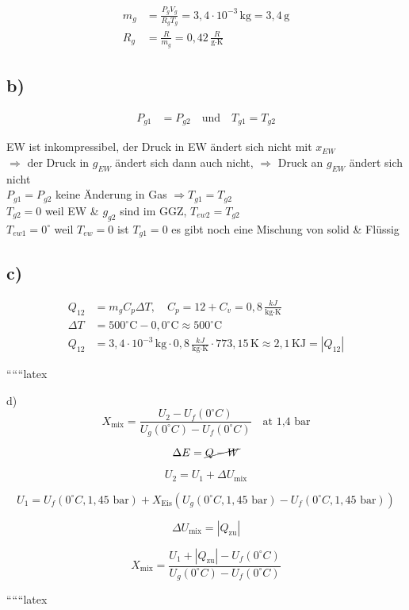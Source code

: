 \begin{align*}
m_g &= \frac{P_g V_g}{R_g T_g} = 3,4 \cdot 10^{-3} \, \text{kg} = 3,4 \, \text{g} \\
R_g &= \frac{R}{m_g} = 0,42 \, \frac{R}{\text{g} \cdot \text{K}}
\end{align*}

\subsection*{b)}
\begin{align*}
P_{g1} &= P_{g2} \quad \text{und} \quad T_{g1} = T_{g2}
\end{align*}

EW ist inkompressibel, der Druck in EW ändert sich nicht mit $x_{EW}$ \\
$\Rightarrow$ der Druck in $g_{EW}$ ändert sich dann auch nicht, $\Rightarrow$ Druck an $g_{EW}$ ändert sich nicht \\
$P_{g1} = P_{g2}$ \quad keine Änderung in Gas $\Rightarrow T_{g1} = T_{g2}$ \\
$T_{g2} = 0$ \quad weil EW \& $g_{g2}$ sind im GGZ, $T_{ew2} = T_{g2}$ \\
$T_{ew1} = 0^\circ$ \quad weil $T_{ew} = 0$ \quad ist $T_{g1} = 0$ \quad es gibt noch eine Mischung von solid \& Flüssig

\subsection*{c)}
\begin{align*}
Q_{12} &= m_g C_p \Delta T, \quad C_p = 12 + C_v = 0,8 \, \frac{kJ}{\text{kg} \cdot \text{K}} \\
\Delta T &= 500^\circ \text{C} - 0,0^\circ \text{C} \approx 500^\circ \text{C} \\
Q_{12} &= 3,4 \cdot 10^{-3} \, \text{kg} \cdot 0,8 \, \frac{kJ}{\text{kg} \cdot \text{K}} \cdot 773,15 \, \text{K} \approx 2,1 \, \text{KJ} = |Q_{12}|
\end{align*}

``````latex


d)
\[
X_{\text{mix}} = \frac{U_2 - U_f(0^\circ C)}{U_g(0^\circ C) - U_f(0^\circ C)} \quad \text{at 1,4 bar}
\]

\[
\Delta E = \cancel{Q - W}
\]

\[
U_2 = U_1 + \Delta U_{\text{mix}}
\]

\[
U_1 = U_f(0^\circ C, 1,45 \text{ bar}) + X_{\text{Eis}} \left( U_g(0^\circ C, 1,45 \text{ bar}) - U_f(0^\circ C, 1,45 \text{ bar}) \right)
\]

\[
\Delta U_{\text{mix}} = |Q_{\text{zu}}|
\]

\[
X_{\text{mix}} = \frac{U_1 + |Q_{\text{zu}}| - U_f(0^\circ C)}{U_g(0^\circ C) - U_f(0^\circ C)}
\]

``````latex


